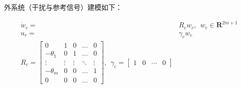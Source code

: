 \documentclass[
  12pt,
  a4paper
]{article}
\begin{document}
外系统（干扰与参考信号）建模如下：

\[\begin{aligned}
{\dot{w}}_{c} = & R_{c}w_{c},\ \ w_{c} \in \mathbf{R}^{2m + 1} \\
u_{r} = & \gamma_{c}w_{c} \\
R_{c} = \begin{bmatrix}
0 & 1 & 0 & \ldots & 0 \\
 - \theta_{1} & 0 & 1 & \ldots & 0 \\
 \vdots & \vdots & \vdots & \ddots & \vdots \\
 - \theta_{m} & 0 & 0 & \ldots & 1 \\
0 & 0 & 0 & \ldots & 0
\end{bmatrix},\ \ \gamma_{c} = \begin{bmatrix}
1 & 0 & \cdots & 0
\end{bmatrix}
\end{aligned}\]
\end{document}
